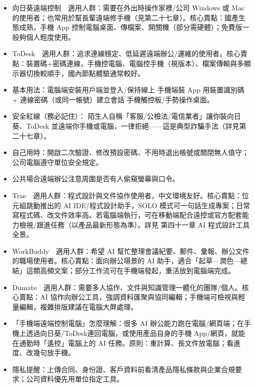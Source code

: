 \begin{itemize}
  \item 向日葵遠端控制　適用人群：需要在外出時操作家裡/公司 Windows 或 Mac 的使用者；也常用於幫長輩遠端修手機（見第二十七章）。核心賣點：國產生態成熟，手機 App 控制電腦桌面、傳檔案、開關機（部分需硬體）；免費版一般夠個人輕度使用。
  \item ToDesk　適用人群：追求連線穩定、低延遲遠端辦公/運維的使用者。核心賣點：裝置碼+密碼連線，手機控電腦、電腦控手機（視版本）、檔案傳輸與多顯示器切換較順手，國內節點體驗通常較好。
  \item 基本用法：電腦端安裝用戶端並登入/保持線上 手機端裝 App 用裝置識別碼 + 連線密碼（或同一帳號）建立會話 手機觸控板/手勢操作桌面。
  \item 安全紅線（務必記住）： 陌生人自稱「客服/公檢法/電信業者」讓你裝向日葵、ToDesk 並遠端你手機或電腦，一律拒絕——這是典型詐騙手法（詳見第二十七章）。
  \item 自己用時：開啟二次驗證、修改預設密碼、不用時退出帳號或關閉無人值守；公司電腦遵守單位安全規定。
  \item 公共場合遠端辦公注意周圍是否有人偷窺螢幕與口令。
\end{itemize}


\begin{itemize}
  \item Trae　適用人群：程式設計與文件協作使用者，中文環境友好。核心賣點：位元組跳動推出的 AI IDE/程式設計助手，SOLO 模式可一句話生成專案；日常寫程式碼、改文件效率高。若電腦端執行，可在移動端配合遠控或官方配套能力檢視/跟進任務（以產品最新形態為準）。詳見 第四十一章 AI 程式設計工具全景。
  \item WorkBuddy　適用人群：希望 AI 幫忙整理會議紀要、郵件、彙報、辦公文件的職場使用者。核心賣點：面向辦公場景的 AI 助手，適合「起草—潤色—總結」這類高頻文案；部分工作流可在手機端發起，重活放到電腦端完成。
  \item Dumate　適用人群：需要多人協作、文件與知識管理一體化的團隊/個人。核心賣點：AI 協作向辦公工具，強調資料匯聚與協同編輯；手機端可檢視與輕量編輯，複雜排版建議在電腦大屏處理。
  \item 「手機端遠端控制電腦」怎麼理解：很多 AI 辦公能力跑在電腦/網頁端；在手機上透過向日葵/ToDesk連回電腦，或使用產品自身的手機 App/網頁，就能在通勤時「遙控」電腦上的 AI 任務。原則：重計算、長文件放電腦；看進度、改幾句放手機。
  \item 隱私提醒：上傳合同、身份證、客戶資料前看清產品隱私條款與企業合規要求；公司資料優先用單位指定工具。
\end{itemize}

